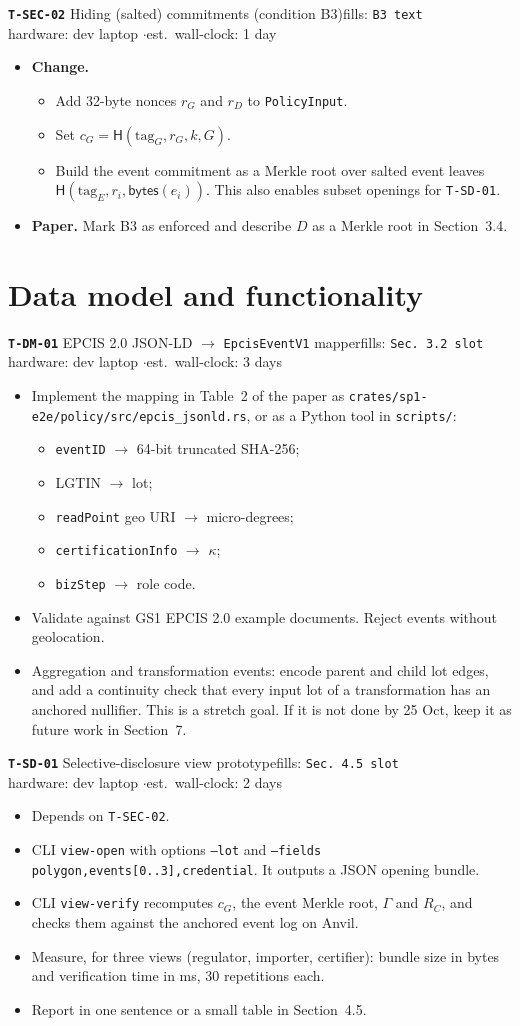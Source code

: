 \documentclass[10pt,a4paper]{article}
\newcommand{\task}[6]{%
\par\medskip\noindent\colorbox{blue!8}{\parbox{\dimexpr\linewidth-2\fboxsep}{%
\textbf{\texttt{#1}} \enspace #2\hfill{\small fills: \texttt{#3}}\\
{\small hardware: #4 \quad$\cdot$\quad est.\ wall-clock: #5}}}\par
\begin{itemize}#6\end{itemize}}
\begin{document}
\task{T-SEC-02}{Hiding (salted) commitments (condition B3)}{B3 text}{dev laptop}{1 day}{
\item \textbf{Change.}
  \begin{itemize}
  \item Add 32-byte nonces $r_G$ and $r_D$ to \texttt{PolicyInput}.
  \item Set $c_G=\mathsf{H}(\text{tag}_G,r_G,k,G)$.
  \item Build the event commitment as a Merkle root over salted event leaves $\mathsf{H}(\text{tag}_E,r_i,\mathsf{bytes}(e_i))$. This also enables subset openings for \texttt{T-SD-01}.
  \end{itemize}
\item \textbf{Paper.} Mark B3 as enforced and describe $D$ as a Merkle root in Section~3.4.
}

\section{Data model and functionality}

\task{T-DM-01}{EPCIS 2.0 JSON-LD $\rightarrow$ \texttt{EpcisEventV1} mapper}{Sec.~3.2 slot}{dev laptop}{3 days}{
\item Implement the mapping in Table~2 of the paper as \texttt{crates/sp1-e2e/policy/src/epcis\_jsonld.rs}, or as a Python tool in \texttt{scripts/}:
  \begin{itemize}
  \item \texttt{eventID} $\rightarrow$ 64-bit truncated SHA-256;
  \item LGTIN $\rightarrow$ lot;
  \item \texttt{readPoint} geo URI $\rightarrow$ micro-degrees;
  \item \texttt{certificationInfo} $\rightarrow$ $\kappa$;
  \item \texttt{bizStep} $\rightarrow$ role code.
  \end{itemize}
\item Validate against GS1 EPCIS 2.0 example documents. Reject events without geolocation.
\item Aggregation and transformation events: encode parent and child lot edges, and add a continuity check that every input lot of a transformation has an anchored nullifier. This is a stretch goal. If it is not done by 25 Oct, keep it as future work in Section~7.
}

\task{T-SD-01}{Selective-disclosure view prototype}{Sec.~4.5 slot}{dev laptop}{2 days}{
\item Depends on \texttt{T-SEC-02}.
\item CLI \texttt{view-open} with options \texttt{--lot} and \texttt{--fields polygon,events[0..3],credential}. It outputs a JSON opening bundle.
\item CLI \texttt{view-verify} recomputes $c_G$, the event Merkle root, $\Gamma$ and $R_C$, and checks them against the anchored event log on Anvil.
\item Measure, for three views (regulator, importer, certifier): bundle size in bytes and verification time in ms, 30 repetitions each.
\item Report in one sentence or a small table in Section~4.5.
}
\end{document}
